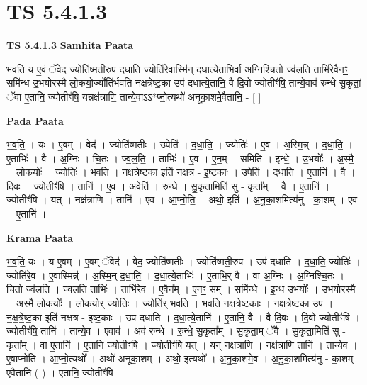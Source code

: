 \documentclass[17pt]{extarticle}
\begin{document}
\section{ TS 5.4.1.3 }

\textbf{TS 5.4.1.3 } \newline
\textbf{Samhita Paata} \newline

भ॑वति॒ य ए॒वं ॅवेद॒ ज्योति॑ष्मती॒रुप॑ दधाति॒ ज्योति॑रे॒वास्मि॑न् दधात्ये॒ताभि॒र्वा अ॒ग्निश्चि॒तो ज्व॑लति॒ ताभि॑रे॒वैनꣳ॒॒ समि॑न्ध उ॒भयो॑रस्मै लो॒कयो॒र्ज्योति॑र्भवति नक्षत्रेष्ट॒का उप॑ दधात्ये॒तानि॒ वै दि॒वो ज्योतीꣳ॑षि॒ तान्ये॒वाव॑ रुन्धे सु॒कृतां॒ ॅवा ए॒तानि॒ ज्योतीꣳ॑षि॒ यन्नक्ष॑त्राणि॒ तान्ये॒वाऽऽ*प्नो॒त्यथो॑ अनूका॒शमे॒वैतानि॒ - [  ] \newline

\textbf{Pada Paata} \newline

भ॒व॒ति॒ । यः । ए॒वम् । वेद॑ । ज्योति॑ष्मतीः । उपेति॑ । द॒धा॒ति॒ । ज्योतिः॑ । ए॒व । अ॒स्मि॒न्न् । द॒धा॒ति॒ । ए॒ताभिः॑ । वै । अ॒ग्निः । चि॒तः । ज्व॒ल॒ति॒ । ताभिः॑ । ए॒व । ए॒न॒म् । समिति॑ । इ॒न्धे॒ । उ॒भयोः᳚ । अ॒स्मै॒ । लो॒कयोः᳚ । ज्योतिः॑ । भ॒व॒ति॒ । न॒क्ष॒त्रे॒ष्ट॒का इति॑ नक्षत्र - इ॒ष्ट॒काः । उपेति॑ । द॒धा॒ति॒ । ए॒तानि॑ । वै । दि॒वः । ज्योतीꣳ॑षि । तानि॑ । ए॒व । अवेति॑ । रु॒न्धे॒ । सु॒कृता॒मिति॑ सु - कृता᳚म् । वै । ए॒तानि॑ । ज्योतीꣳ॑षि । यत् । नक्ष॑त्राणि । तानि॑ । ए॒व । आ॒प्नो॒ति॒ । अथो॒ इति॑ । अ॒नू॒का॒शमित्य॑नु - का॒शम् । ए॒व । ए॒तानि॑ ।  \newline


\textbf{Krama Paata} \newline

भ॒व॒ति॒ यः । य ए॒वम् । ए॒वम् ॅवेद॑ । वेद॒ ज्योति॑ष्मतीः । ज्योति॑ष्मती॒रुप॑ । उप॑ दधाति । द॒धा॒ति॒ ज्योतिः॑ । ज्योति॑रे॒व । ए॒वास्मिन्न्॑ । अ॒स्मि॒न् द॒धा॒ति॒ । द॒धा॒त्ये॒ताभिः॑ । ए॒ताभि॒र् वै । वा अ॒ग्निः । अ॒ग्निश्चि॒तः । चि॒तो ज्व॑लति । ज्व॒ल॒ति॒ ताभिः॑ । ताभि॑रे॒व । ए॒वैन᳚म् । ए॒नꣳ॒॒ सम् । समि॑न्धे । इ॒न्ध॒ उ॒भयोः᳚ । उ॒भयो॑रस्मै । अ॒स्मै॒ लो॒कयोः᳚ । लो॒कयो॒र् ज्योतिः॑ । ज्योति॑र् भवति । भ॒व॒ति॒ न॒क्ष॒त्रे॒ष्ट॒काः । न॒क्ष॒त्रे॒ष्ट॒का उप॑ । न॒क्ष॒त्रे॒ष्ट॒का इति॑ नक्षत्र - इ॒ष्ट॒काः । उप॑ दधाति । द॒धा॒त्ये॒तानि॑ । ए॒तानि॒ वै । वै दि॒वः । दि॒वो ज्योतीꣳ॑षि । ज्योतीꣳ॑षि॒ तानि॑ । तान्ये॒व । ए॒वाव॑ । अव॑ रुन्धे । रु॒न्धे॒ सु॒कृता᳚म् । सु॒कृता॒म् ॅवै । सु॒कृता॒मिति॑ सु - कृता᳚म् । वा ए॒तानि॑ । ए॒तानि॒ ज्योतीꣳ॑षि । ज्योतीꣳ॑षि॒ यत् । यन् नक्ष॑त्राणि । नक्ष॑त्राणि॒ तानि॑ । तान्ये॒व । ए॒वाप्नो॑ति । आ॒प्नो॒त्यथो᳚ । अथो॑ अनूका॒शम् । अथो॒ इत्यथो᳚ । अ॒नू॒का॒शमे॒व । अ॒नू॒का॒शमित्य॑नु - का॒शम् । ए॒वैतानि॑ ( ) । ए॒तानि॒ ज्योतीꣳ॑षि \newline
\end{document}
